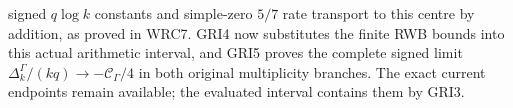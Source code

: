 signed $q\log k$ constants and simple-zero $5/7$ rate
transport to this centre by addition, as proved in WRC7.
GRI4 now substitutes the finite RWB bounds into this actual
arithmetic interval, and GRI5 proves the complete signed limit
$\Delta_k^\Gamma/(kq)\to-\mathcal C_\Gamma/4$ in both
original multiplicity branches. The exact current endpoints
remain available; the evaluated interval contains them by GRI3.